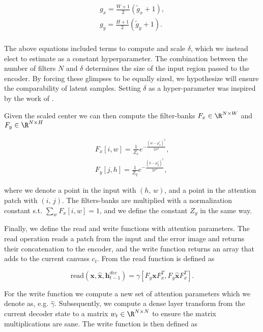 \begin{align}
g_x = \frac{W +1 }{2} (\tilde{g}_x +1 ), \\
g_y = \frac{H +1 }{2} (\tilde{g}_y +1 ). \\
\end{align}

\noindent The above equations included terms to compute and scale $\delta$, which we instead elect to estimate as a constant hyperparameter. The combination between the number of filters $N$ and $\delta$ determines the size of the input region passed to the encoder. By forcing these glimpses to be equally sized, we hypothesize will ensure the comparability of latent samples. Setting $\delta$ as a hyper-parameter was inspired by the work of \citet{Harris2019}.

Given the scaled center we can then compute the filter-banks $F_x \in \R^{N \times W}$ and $F_y \in \R^{N \times H}$

\begin{align}
F_x [i, w] = \frac{1}{Z_x}e^{-\frac{(w - \mu_x^i)^2}{2\sigma^2}},\label{eq:Fx} \\
F_y [j, h] = \frac{1}{Z_y}e^{-\frac{(h - \mu_y^j)^2}{2\sigma^2}},\label{eq:Fy}
\end{align}

\noindent where we denote a point in the input with $(h,\, w)$, and a point in the attention patch with $(i,\, j)$. The filters-banks are multiplied with a normalization constant s.t. $\sum_w F_x[i, w] = 1$, and we define the constant $Z_y$ in the same way. 

Finally, we define the read and write functions with attention parameters. The read operation reads a patch from the input and the error image and returns their concatenation to the encoder, and the write function returns an array that adds to the current canvass $c_t$. From \citet{Gregor2015} the read function is defined as

\begin{equation}\label{eq:read}
\text{read}(\boldsymbol{x}, \boldsymbol{\hat{x}}, \boldsymbol{h}_{t-1}^{dec}) = \gamma[F_y \boldsymbol{x} F_x^T, F_y \boldsymbol{\hat{x}} F_x^T].
\end{equation} 

\noindent For the write function we compute a new set of attention parameters which we denote as, e.g. $\hat{\gamma}$. Subsequently, we compute a dense layer transform from the current decoder state to a matrix $w_t \in \R^{N \times N}$ to ensure the matrix multiplications are sane. The write function is then defined as

